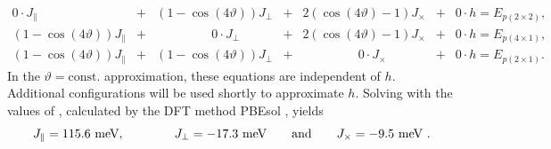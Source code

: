 	\begin{equation}
	\begin{split}
		0\cdot                           J_\parallel&+&\left(1-\cos(4\vartheta)\right)              J_\perp&+&2(\cos(4\vartheta)-1) J_\times &+&0\cdot h= E_{p(2\times2)}, \\
		\left(1-\cos(4\vartheta) \right) J_\parallel&+&\qquad \qquad ~~ 0\cdot                      J_\perp&+&2(\cos(4\vartheta)-1) J_\times &+&0\cdot h= E_{p(4\times1)}, \\
		\left(1-\cos(4\vartheta) \right)J_\parallel &+&\left(1 - \cos\left(4\vartheta \right)\right)J_\perp&+&\qquad\qquad~~0\cdot  J_\times &+&0\cdot h= E_{p(2\times1)}. \end{split}
	\end{equation}
	In the $\vartheta =	\text{const.}$ approximation, these equations are independent of $h$. Additional configurations will be used shortly to approximate $h$.
	Solving with the values of \cite{brand2023critical}, calculated by the DFT method PBEsol \cite{perdew2008restoring}, yields
	\begin{equation}
		J_\parallel =	115.6 \text{ meV} , \qquad \qquad J_\perp =	-17.3 \text{ meV} \qquad \text{and} \qquad J_\times =	-9.5 \text{ meV}~. \\		
	\end{equation}
